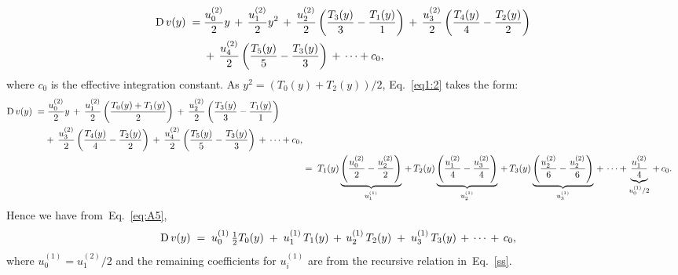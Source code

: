 \documentclass[%
secnumarabic,%
 amssymb, amsmath,%
 aps,prf,superscriptaddress,longbibliography
frontmatterverbose,
]{revtex4-2}
\begin{document}
\begin{align}\label{eq1:2}
  \begin{split}
    \mathrm D\,v(y) \;=&\; \frac{u^{(2)}_0}{2}y \,+ \, \frac{u^{(2)}_1}{2}y^2 \,+\,\frac{u^{(2)}_2}{2}\left(\frac{T_3(y)}{3} - \frac{T_1(y)}{1}\right) \,+\,\frac{u^{(2)}_3}{2}\left(\frac{T_4(y)}{4} - \frac{T_2(y)}{2}\right)\,\\
    &\;+\,\frac{u^{(2)}_4}{2}\left(\frac{T_5(y)}{5} - \frac{T_3(y)}{3}\right)\,+\, \cdots + c_0,
  \end{split}
\end{align}
where $c_0$ is the effective integration constant.
As $y^2 = (T_0(y)+T_2(y))/2$, Eq.~\eqref{eq1:2} takes the form:
\begin{align}
  \begin{split}
  \mathrm D\,v(y)\;=&\; \frac{u^{(2)}_0}{2}y \,+\, \frac{u^{(2)}_1}{2} \left(\frac{T_0(y) + T_1(y)}{2}\right) \,+\,\frac{u^{(2)}_2}{2}\left(\frac{T_3(y)}{3} - \frac{T_1(y)}{1}\right) \,\\&+\,\frac{u^{(2)}_3}{2}\left(\frac{T_4(y)}{4} - \frac{T_2(y)}{2}\right)\,+\,\frac{u^{(2)}_4}{2}\left(\frac{T_5(y)}{5} - \frac{T_3(y)}{3}\right)\,+\, \cdots + c_0,
\end{split} \\
  &=\; T_1(y)\underbrace{\left(\frac{u^{(2)}_0}{2} - \frac{u^{(2)}_2}{2}\right)}_{u^{(1)}_1} \,+\,T_2(y)\underbrace{\left(\frac{u^{(2)}_1}{4} - \frac{u^{(2)}_3}{4} \right)}_{u^{(1)}_2} \,+\,T_3(y)\underbrace{\left(\frac{u^{(2)}_2}{6} - \frac{u^{(2)}_2}{6}\right)}_{u^{(1)}_3} \,+\,\cdots + \underbrace{\frac{u^{(2)}_1}{4}}_{u^{(1)}_0/2} \,+\, c_0.\label{eq:A5}
\end{align}
Hence we have from~Eq.~\eqref{eq:A5},
\begin{align}
  \mathrm D\, v(y) \;&=\; u^{(1)}_0 \,\tfrac{1}{2}T_0(y) \;+\; u^{(1)}_1\,T_1(y) \,+\, u^{(1)}_2\,T_2(y) \;+\; u^{(1)}_3\,T_3(y) \,+\, \cdots \,+\, c_0,
\end{align}
where $u^{(1)}_0 = u^{(2)}_1/2$ and the remaining coefficients for $u^{(1)}_i$ are from the recursive relation in~Eq.~\eqref{ss}.

\newpage

\singlespacing

\end{document}
